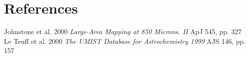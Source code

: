 \documentclass{article}
\begin{document}
\section*{References}
Johnstone et al. 2000 \textit{Large-Area Mapping at 850 Microns. II} ApJ 545,
pp. 327\\
Le Teuff et al. 2000 \textit{The UMIST Database for Astrochemistry 1999} AJS
146, pp. 157\\
\\
\\
\end{document}
